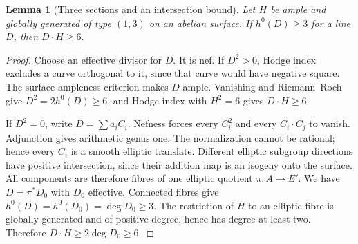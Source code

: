 \documentclass[11pt]{article}
\newtheorem{lemma}[theorem]{Lemma}
\theoremstyle{remark}\newtheorem{remark}[theorem]{Remark}
\begin{document}
\begin{lemma}[Three sections and an intersection bound]\label{lem:divisor}
Let $H$ be ample and globally generated of type $(1,3)$ on an abelian surface. If $h^0(D)\ge3$ for a line $D$, then $D\cdot H\ge6$.
\end{lemma}
\begin{proof}
Choose an effective divisor for $D$. It is nef. If $D^2>0$, Hodge index excludes a curve orthogonal to it, since that curve would have negative square. The surface ampleness criterion makes $D$ ample. Vanishing and Riemann--Roch give $D^2=2h^0(D)\ge6$, and Hodge index with $H^2=6$ gives $D\cdot H\ge6$.

If $D^2=0$, write $D=\sum a_iC_i$. Nefness forces every $C_i^2$ and every $C_i\cdot C_j$ to vanish. Adjunction gives arithmetic genus one. The normalization cannot be rational; hence every $C_i$ is a smooth elliptic translate. Different elliptic subgroup directions have positive intersection, since their addition map is an isogeny onto the surface. All components are therefore fibres of one elliptic quotient $\pi:A\to E'$. We have $D=\pi^*D_0$ with $D_0$ effective. Connected fibres give $h^0(D)=h^0(D_0)=\deg D_0\ge3$. The restriction of $H$ to an elliptic fibre is globally generated and of positive degree, hence has degree at least two. Therefore $D\cdot H\ge2\deg D_0\ge6$.
\end{proof}
\end{document}
